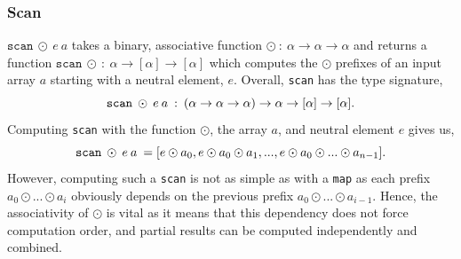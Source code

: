\documentclass[11pt]{article}
\begin{document}
\subsubsection{Scan}
$\texttt{scan} \: \odot \: e \: a$ takes a binary, associative function $\odot \: : \: \alpha \to \alpha \to \alpha$ and returns a function
 $\mathtt{scan} \:\odot \: : \: \alpha \to [\alpha] \to [\alpha]$ which
 computes the $\odot$ prefixes of an input array $a$ starting with a neutral element, $e$. Overall, \texttt{scan} has the type signature,
$$\mathtt{scan} \: \odot \: e \: a \: : \:(\alpha \to \alpha \to \alpha) \to \alpha \to [\alpha] \to [\alpha]\mathnormal{.}$$
Computing \texttt{scan} with the function $\odot$, the array $a$, and neutral element $e$ gives us,
$$\mathtt{scan} \: \odot \: e \: a \: = [e \odot a_0, e \odot a_0 \odot a_1, ..., e \odot a_0 \odot ... \odot a_{n-1}]\mathnormal{.}$$
However, computing such a \texttt{scan} is not as simple as with a \texttt{map} as each prefix $a_0 \odot ... \odot a_i$ obviously depends on the previous prefix $a_0 \odot ... \odot a_{i-1}$. Hence, 
the associativity of $\odot$ is vital as it means that this dependency does not force computation order, and partial results can be computed independently and combined.
\end{document}
